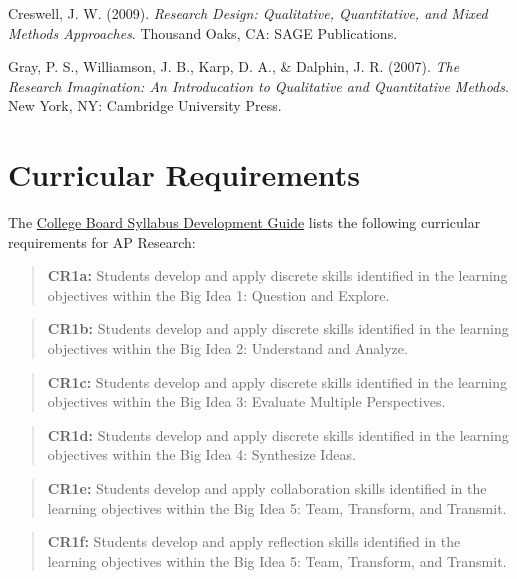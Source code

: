 \documentclass[]{article}
\begin{document}
Creswell, J. W. (2009). \emph{Research Design: Qualitative,
Quantitative, and Mixed Methods Approaches}. Thousand Oaks, CA:
SAGE Publications.

Gray, P. S., Williamson, J. B., Karp, D. A., \& Dalphin, J. R.
(2007). \emph{The Research Imagination: An Introducation to Qualitative
and Quantitative Methods}. New York, NY: Cambridge University
Press.

\hypertarget{curricular-requirements}{%
\section{Curricular Requirements}\label{curricular-requirements}}

The \href{https://secure-media.collegeboard.org/digitalServices/pdf/ap/ap-course-audit/ap-research-syllabus-development-guide.pdf}{College Board Syllabus Development Guide} lists the following curricular requirements for AP Research:

\begin{quote}
\textbf{CR1a:} Students develop and apply discrete skills identified in the learning objectives within the Big Idea 1: Question and Explore.
\end{quote}

\begin{quote}
\textbf{CR1b:} Students develop and apply discrete skills identified in the learning objectives within the Big Idea 2: Understand and Analyze.
\end{quote}

\begin{quote}
\textbf{CR1c:} Students develop and apply discrete skills identified in the learning objectives within the Big Idea 3: Evaluate Multiple Perspectives.
\end{quote}

\begin{quote}
\textbf{CR1d:} Students develop and apply discrete skills identified in the learning objectives within the Big Idea 4: Synthesize Ideas.
\end{quote}

\begin{quote}
\textbf{CR1e:} Students develop and apply collaboration skills identified in the learning objectives within the Big Idea 5: Team, Transform, and Transmit.
\end{quote}

\begin{quote}
\textbf{CR1f:} Students develop and apply reflection skills identified in the learning objectives within the Big Idea 5: Team, Transform, and Transmit.
\end{quote}
\end{document}
